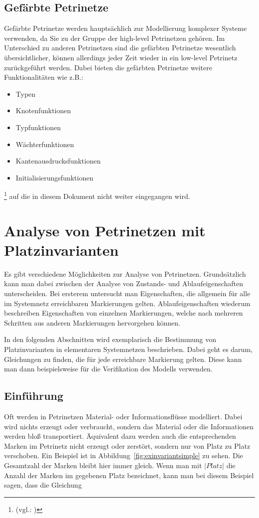 	\subsection{Gefärbte Petrinetze}
		Gefärbte Petrinetze werden hauptsächlich zur Modellierung komplexer Systeme verwenden, da Sie zu der Gruppe der high-level Petrinetzen gehören.
		Im Unterschied zu anderen Petrinetzen sind die gefärbten Petrinetze wesentlich übersichtlicher, können allerdings jeder Zeit wieder in ein low-level Petrinetz zurückgeführt werden.
		Dabei bieten die gefärbten Petrinetze weitere Funktionalitäten wie z.B.:
		\begin{itemize}
		    \item Typen
		    \item Knotenfunktionen
		    \item Typfunktionen
		    \item Wächterfunktionen
		    \item Kantenausdrucksfunktionen
		    \item Initialisierungsfunktionen
		\end{itemize}
		\footnote{(vgl.: \cite{tu_dresden:petrinetze})}
		auf die in diesem Dokument nicht weiter eingegangen wird.

\section{Analyse von Petrinetzen mit Platzinvarianten}
	Es gibt verschiedene Möglichkeiten zur Analyse von Petrinetzen. Grundsätzlich kann man dabei zwischen der Analyse von Zustands- und Ablaufeigenschaften unterscheiden. Bei ersterem untersucht man Eigenschaften, die allgemein für alle im Systemnetz erreichbaren Markierungen gelten. Ablaufeigenschaften wiederum beschreiben Eigenschaften von einzelnen Markierungen, welche nach mehreren Schritten aus anderen Markierungen hervorgehen können.

	In den folgenden Abschnitten wird exemplarisch die Bestimmung von Platzinvarianten in elementaren Systemnetzen beschrieben. Dabei geht es darum, Gleichungen zu finden, die für jede erreichbare Markierung gelten. Diese kann man dann beispielsweise für die Verifikation des Modells verwenden.

	\subsection{Einführung}
	\label{sub:platzinvarianten_einf}
		Oft werden in Petrinetzen Material- oder Informationsflüsse modelliert. Dabei wird nichts erzeugt oder verbraucht, sondern das Material oder die Informationen werden bloß transportiert. Äquivalent dazu werden auch die entsprechenden Marken im Petrinetz nicht erzeugt oder zerstört, sondern nur von Platz zu Platz verschoben. Ein Beispiel ist in Abbildung~\ref{fig:exinvariantsimple} zu sehen. Die Gesamtzahl der Marken bleibt hier immer gleich. Wenn man mit $|Platz|$ die Anzahl der Marken im gegebenen Platz bezeichnet, kann man bei diesem Beispiel sagen, dass die Gleichung

